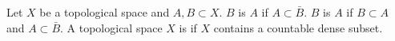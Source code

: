 Let $X$ be a topological space and $A, B \subset X$. $B$ is  $A$ if $A \subset \bar{B}$. $B$ is  $A$ if $B \subset A$ and $A \subset \bar{B}$. A topological space $X$ is  if $X$ contains a countable dense subset.
